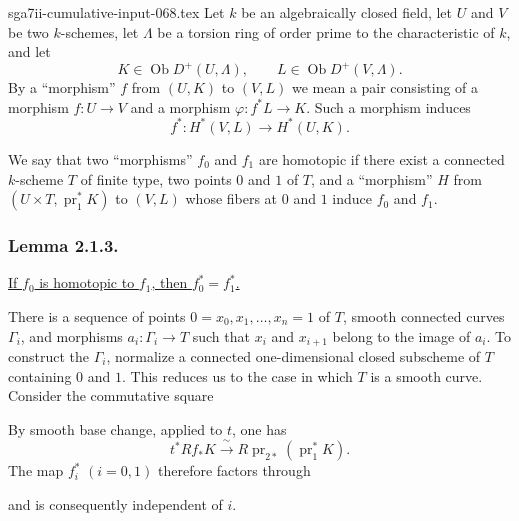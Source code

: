 \begin{filecontents*}{sga7ii-cumulative-input-068.tex}
Let $k$ be an algebraically closed field, let $U$ and $V$ be two
$k$-schemes, let $\Lambda$ be a torsion ring of order prime to the
characteristic of $k$, and let
\[
K\in\operatorname{Ob}D^+(U,\Lambda),
\qquad L\in\operatorname{Ob}D^+(V,\Lambda).
\]
By a ``morphism'' $f$ from $(U,K)$ to $(V,L)$ we mean a pair
consisting of a morphism $f:U\to V$ and a morphism
$\varphi:f^*L\to K$.  Such a morphism induces
\[
f^*:H^*(V,L)\longrightarrow H^*(U,K).
\]

We say that two ``morphisms'' $f_0$ and $f_1$ are homotopic if there
exist a connected $k$-scheme $T$ of finite type, two points $0$ and
$1$ of $T$, and a ``morphism'' $H$ from
$(U\times T,\operatorname{pr}_1^*K)$ to $(V,L)$ whose fibers at $0$
and $1$ induce $f_0$ and $f_1$.

\subsubsection*{Lemma 2.1.3.}
\underline{If $f_0$ is homotopic to $f_1$, then
$f_0^*=f_1^*$.}

There is a sequence of points
$0=x_0,x_1,\ldots,x_n=1$ of $T$, smooth connected curves
$\Gamma_i$, and morphisms $a_i:\Gamma_i\to T$ such that $x_i$ and
$x_{i+1}$ belong to the image of $a_i$.  To construct the
$\Gamma_i$, normalize a connected one-dimensional closed subscheme
of $T$ containing $0$ and $1$.  This reduces us to the case in which
$T$ is a smooth curve.  Consider the commutative square
\begin{center}
\end{center}
By smooth base change, applied to $t$, one has
\[
t^*Rf_*K\xrightarrow{\ \sim\ }
R\operatorname{pr}_{2*}(\operatorname{pr}_1^*K).
\]
The map $f_i^*$ $(i=0,1)$ therefore factors through
\begin{center}
\end{center}
and is consequently independent of $i$.
\end{filecontents*}
